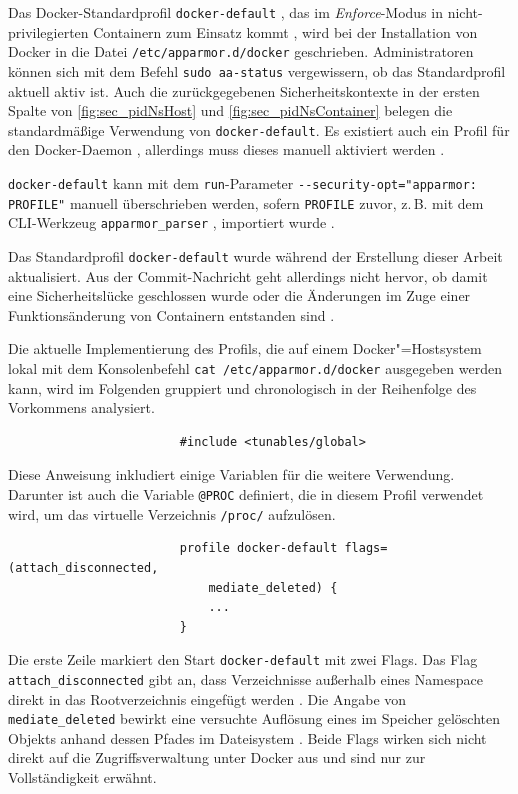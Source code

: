 \documentclass[../main.tex]{subfiles}
\begin{document}
				Das Docker-Standardprofil \texttt{docker-default} \cite{githubAppArmorProfileContainer}, das im \emph{Enforce}-Modus in nicht-privilegierten Containern zum Einsatz kommt \cite{docker110Security}, wird bei der Installation von Docker in die Datei \texttt{/etc/apparmor.d/docker} geschrieben. Administratoren können sich mit dem Befehl \texttt{sudo aa-status} vergewissern, ob das Standardprofil aktuell aktiv ist. Auch die zurückgegebenen Sicherheitskontexte in der ersten Spalte von \fig \ref{fig:sec_pidNsHost} und \fig \ref{fig:sec_pidNsContainer} belegen die standardmäßige Verwendung von \texttt{docker-default}. Es existiert auch ein Profil für den Docker-Daemon \cite{githubAppArmorProfileDaemon}, allerdings muss dieses manuell aktiviert werden \cite{githubAppArmorDoc}.

				\clearpage

				\texttt{docker-default} kann mit dem \texttt{run}-Parameter \texttt{-{}-security-opt="{}apparmor:} \texttt{PROFILE"{}} manuell überschrieben werden, sofern \texttt{PROFILE} zuvor, z.\,B. mit dem \acrshort{CLI}-Werkzeug \texttt{apparmor\_parser} \cite{apparmorParser}, importiert wurde \cite{dockerRun}.


					Das Standardprofil \texttt{docker-default} wurde während der Erstellung dieser Arbeit aktualisiert. Aus der Commit-Nachricht geht allerdings nicht hervor, ob damit eine Sicherheitslücke geschlossen wurde oder die Änderungen im Zuge einer Funktionsänderung von Containern entstanden sind \cite{githubAppArmorProfileContainerFix}.

					Die aktuelle Implementierung des Profils, die auf einem Docker"=Hostsystem lokal mit dem Konsolenbefehl \texttt{cat /etc/apparmor.d/docker} ausgegeben werden kann, wird im Folgenden gruppiert und chronologisch in der Reihenfolge des Vorkommens analysiert.

					\begin{lstlisting}
						#include <tunables/global>
					\end{lstlisting}
					Diese Anweisung inkludiert einige Variablen für die weitere Verwendung. Darunter ist auch die Variable \texttt{@{PROC}} definiert, die in diesem Profil verwendet wird, um das virtuelle Verzeichnis \texttt{/proc/} aufzulösen.

					\begin{lstlisting}
						profile docker-default flags=(attach_disconnected,
						    mediate_deleted) {
							...
						}
					\end{lstlisting}
					Die erste Zeile markiert den Start \texttt{docker-default} mit zwei Flags. Das Flag \texttt{attach\_disconnected} gibt an, dass Verzeichnisse außerhalb eines Namespace direkt in das Rootverzeichnis eingefügt werden \cite{apparmorPolicyReference}. Die Angabe von \texttt{mediate\_deleted} bewirkt eine versuchte Auflösung eines im Speicher gelöschten Objekts anhand dessen Pfades im Dateisystem \cite{apparmorFAQ}. Beide Flags wirken sich nicht direkt auf die Zugriffsverwaltung unter Docker aus und sind nur zur Vollständigkeit erwähnt.
\end{document}
